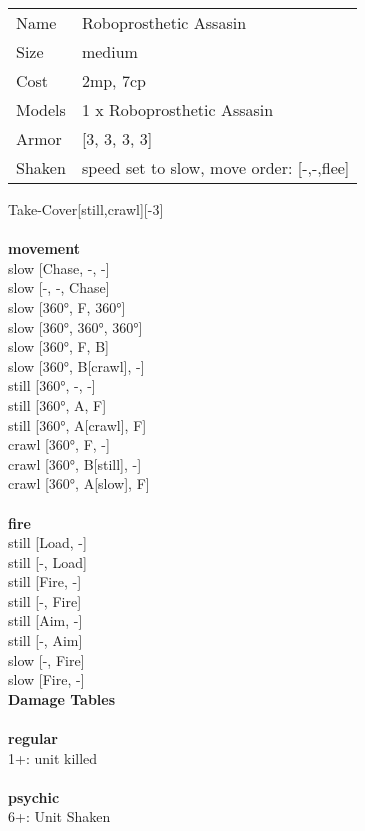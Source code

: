 \begin{tabular}{ll}
  Name & Roboprosthetic Assasin \\
  Size & medium\\
  Cost & 2mp, 7cp\\
  Models & 1 x Roboprosthetic Assasin\\
  Armor & [3, 3, 3, 3]\\
  Shaken & speed set to slow, move order: [-,-,flee]\\
\end{tabular}

\noindent Take-Cover[still,crawl][-3]\\ 


\ \\ {\bf movement } \\
slow [Chase, -, -] \\
slow [-, -, Chase] \\
slow [360°, F, 360°] \\
slow [360°, 360°, 360°] \\
slow [360°, F, B] \\
slow [360°, B[crawl], -] \\
still [360°, -, -] \\
still [360°, A, F] \\
still [360°, A[crawl], F] \\
crawl [360°, F, -] \\
crawl [360°, B[still], -] \\
crawl [360°, A[slow], F] \\
\ \\ {\bf fire } \\
still [Load, -] \\
still [-, Load] \\
still [Fire, -] \\
still [-, Fire] \\
still [Aim, -] \\
still [-, Aim] \\
slow [-, Fire] \\
slow [Fire, -] \\


{\bf Damage Tables} \\
\ \\ {\bf regular } \\
1+: unit killed \\
\ \\ {\bf psychic } \\
6+: Unit Shaken \\


